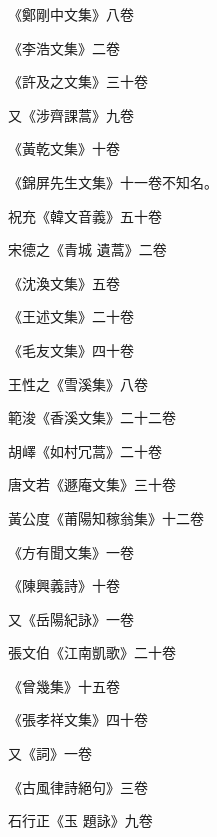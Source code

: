 \begin{pinyinscope}
 《鄭剛中文集》八卷



 《李浩文集》二卷



 《許及之文集》三十卷



 又《涉齊課蒿》九卷



 《黃乾文集》十卷



 《錦屏先生文集》十一卷不知名。



 祝充《韓文音義》五十卷



 宋德之《青城
 遺蒿》二卷



 《沈渙文集》五卷



 《王述文集》二十卷



 《毛友文集》四十卷



 王性之《雪溪集》八卷



 範浚《香溪文集》二十二卷



 胡嶧《如村冗蒿》二十卷



 唐文若《遯庵文集》三十卷



 黃公度《莆陽知稼翁集》十二卷



 《方有聞文集》一卷



 《陳興義詩》十卷



 又《岳陽紀詠》一卷



 張文伯《江南凱歌》二十卷



 《曾幾集》十五卷



 《張孝祥文集》四十卷



 又《詞》一卷



 《古風律詩絕句》三卷


石行正《玉
 題詠》九卷




\end{pinyinscope}
